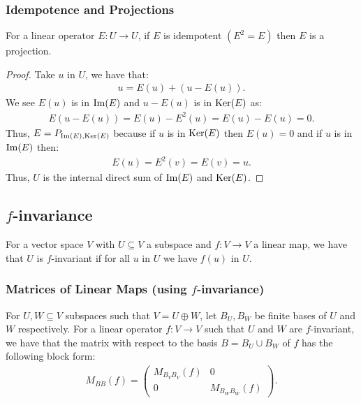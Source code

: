 \subsubsection{Idempotence and Projections}

For a linear operator $E : U \to U$, if $E$ is idempotent $(E^2 = E)$ 
then $E$ is a projection.
\begin{proof}
    Take $u$ in $U$, we have that: \begin{gather*}
        u = E(u) + (u - E(u)).
    \end{gather*} We see $E(u)$ is in $\operatorname{Im}(E)$ and $u - E(u)$ is in 
    $\operatorname{Ker}(E)$ as: \begin{gather*}
        E(u - E(u)) = E(u) - E^2(u) = E(u) - E(u) = 0.
    \end{gather*} Thus, $E = P_{\operatorname{Im}(E), \operatorname{Ker}(E)}$ because if $u$ is
    in $\operatorname{Ker}(E)$ then $E(u) = 0$ and if $u$ is in $\operatorname{Im}(E)$ then: \begin{gather*}
        E(u) = E^2(v) = E(v) = u.
    \end{gather*} Thus, $U$ is the internal direct sum of $\operatorname{Im}(E)$ and
    $\operatorname{Ker}(E)$.
\end{proof}

\subsection{$f$-invariance}

For a vector space $V$ with $U \subseteq V$ a subspace and 
$f : V \to V$ a linear map, we have that $U$ is $f$-invariant
if for all $u$ in $U$ we have $f(u)$ in $U$.

\subsubsection{Matrices of Linear Maps (using $f$-invariance)}

For $U, W \subseteq V$ subspaces such that $V = U \oplus W$, 
let $B_U, B_W$ be finite bases of $U$ and $W$ respectively.
For a linear operator $f : V \to V$ such that $U$ and $W$ are 
$f$-invariant, we have that the matrix with respect
to the basis $B = B_U \cup B_W$ of $f$ has the following block form:
\begin{gather*}
  M_{BB}(f) = \begin{pmatrix}
    M_{B_VB_V}(f) & 0 \\
    0 & M_{B_WB_W}(f)
  \end{pmatrix}.
\end{gather*}